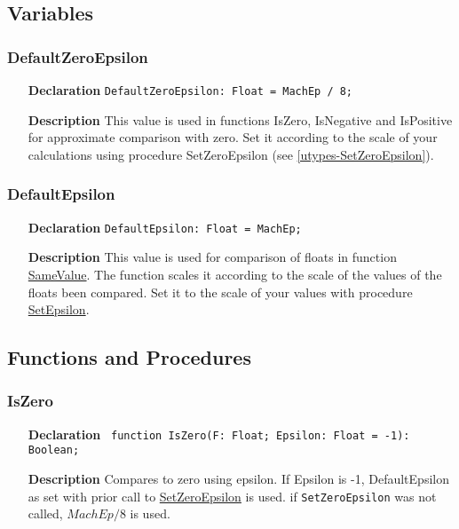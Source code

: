 \documentclass[12pt,a4paper,oneside]{report}
\newcommand{\lmath}[1]{   %
	\marginpar{\vspace{#1} 
		\begin{flushright}
			LMath
	\end{flushright} }
}
\newcommand{\declarationitem}[1]{\textbf{#1}}
\newcommand{\descriptiontitle}[1]{\textbf{#1}}
\newcommand{\code}[1]{\texttt{#1}}
\begin{document}
\subsection{Variables}
\subsubsection{DefaultZeroEpsilon}
\label{utypes-DefaultZeroEpsilon}
\begin{itemize}
\item[\declarationitem{Declaration}\hfill]
\code{DefaultZeroEpsilon: Float = MachEp / 8;}
\item[\descriptiontitle{Description}]This value is used in functions IsZero, IsNegative and IsPositive for approximate comparison with zero. Set it according to the scale of your calculations using procedure SetZeroEpsilon (see \ref{utypes-SetZeroEpsilon}).
\end{itemize}
\subsubsection{DefaultEpsilon}\label{utypes-defaultepsilon}
\begin{itemize}
\label{utype-DefaultEpsilon}
\item[\declarationitem{Declaration}\hfill]
\code{DefaultEpsilon: Float = MachEp;}
\item[\descriptiontitle{Description}]
This value is used for comparison of floats in function \hyperref[utypes-SameValue]{SameValue}. The function scales it according to the scale of the values of the floats been compared. Set it to the scale of your values with procedure \hyperref[utypes-setepsilon]{SetEpsilon}.
\end{itemize}
\subsection{Functions and Procedures}
\subsubsection{IsZero}
\lmath{-24pt}
\label{utypes-IsZero}
\begin{itemize}\item[\declarationitem{Declaration}\hfill]
		\code{
			function IsZero(F: Float; Epsilon: Float = -1): Boolean;}
	\item[\descriptiontitle{Description}]
Compares to zero using epsilon. If Epsilon is {-}1, DefaultEpsilon as set with prior call to \hyperref[utypes-SetZeroEpsilon]{SetZeroEpsilon} is used. if \code{SetZeroEpsilon} was not called, $MachEp / 8$ is used.	
\end{itemize}
\end{document}
